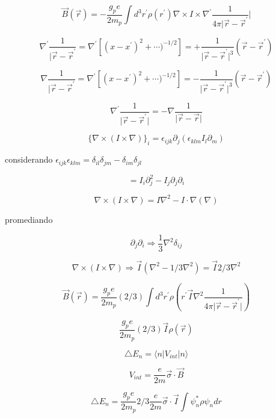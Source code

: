 \documentclass{report}
\begin{document}
\[\overrightarrow{B}(\overrightarrow{r}) = - \frac{g_p e}{2m_p }\int d^3 r^{\prime} \rho (r^{\prime})\nabla \times I \times \nabla^{\prime } \frac{1}{4 \pi \vert\overrightarrow{r}-\overrightarrow{r}^{\prime}}\vert \]

\[\nabla ^{\prime} \frac{1}{\vert\overrightarrow{r}-\overrightarrow{r}^{\prime}} = \nabla^{\prime} [(x-x^{\prime})^2 + \cdots)^{-1/2}] = + \frac{1}{\vert\overrightarrow{r}-\overrightarrow{r}^{\prime}\vert ^3} (\overrightarrow{r}-\overrightarrow{r} ^{\prime}) \]

\[\nabla \frac{1}{\vert\overrightarrow{r}-\overrightarrow{r}^{\prime}} = \nabla^{\prime} [(x-x^{\prime})^2 + \cdots)^{-1/2}] = - \frac{1}{\vert\overrightarrow{r}-\overrightarrow{r}^{\prime}\vert ^3} (\overrightarrow{r}-\overrightarrow{r} ^{\prime}) \]

\[\nabla ^{\prime} \frac{1}{\vert \overrightarrow{r}-\overrightarrow{r}^{\prime}\vert }=- \nabla \frac{1}{\vert \overrightarrow{r}-\overrightarrow{r}\vert} \]

\[\lbrace \nabla \times (I \times \nabla)\rbrace_i = \epsilon_{ijk} \partial_j (\epsilon_{klm} I_l\partial_m ) \]

considerando $\epsilon_{ijk}\epsilon_{klm}= \delta_{il}\delta_{jm}-\delta_{im}\delta_{jl}$

\[= I_i \partial_{j}^{2} - I_j \partial_j \partial_i \]

\[\nabla \times (I \times \nabla ) = I \nabla ^2 - I \cdot \nabla (\nabla) \]

promediando

\[\partial_j \partial_i \Rightarrow \frac{1}{3} \nabla^2 \delta_{ij} \]

\[\nabla \times (I \times \nabla ) \Rightarrow \overrightarrow{I} (\nabla^2 - 1/3 \nabla^2) = \overrightarrow{I} 2/3 \nabla^2 \]

\[\overrightarrow{B}(\overrightarrow{r}) = \frac{g_p e}{2m_p } (2/3) \int d^3 r^{\prime} \rho (r^{\prime} \overrightarrow{I} \nabla^2 \frac{1}{4 \pi \vert \overrightarrow{r} - \overrightarrow{r}^{\prime} \vert})\]

\[\frac{g_p e}{2m_p } (2/3) \overrightarrow{I} \rho (\overrightarrow{r})\]

\[\bigtriangleup E_n = \langle n \vert V_{int} \vert n \rangle\]

\[V_{int} = \frac{e}{2m} \overrightarrow{\sigma} \cdot \overrightarrow{B}\]

\[\bigtriangleup E_n = \frac{g_p e}{2m_p } 2/3 \frac{e}{2m} \overrightarrow{\sigma} \cdot \overrightarrow{I} \int \psi^{*}_{n} \rho \psi _n dr \]
\end{document}
